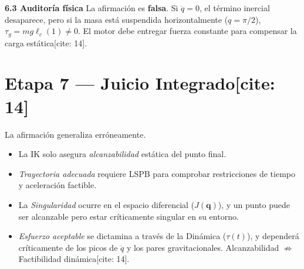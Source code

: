 \documentclass[11pt, a4paper]{article}
\begin{document}
\textbf{6.3 Auditoría física}
La afirmación es \textbf{falsa}. Si $\ddot{q}=0$, el término inercial desaparece, pero si la masa está suspendida horizontalmente ($q=\pi/2$), $\tau_g = mg\ell_c(1) \neq 0$. El motor debe entregar fuerza constante para compensar la carga estática[cite: 14].

\section*{Etapa 7 — Juicio Integrado[cite: 14]}
La afirmación generaliza erróneamente. 
\begin{itemize}
    \item La IK solo asegura \textit{alcanzabilidad} estática del punto final.
    \item \textit{Trayectoria adecuada} requiere LSPB para comprobar restricciones de tiempo y aceleración factible.
    \item La \textit{Singularidad} ocurre en el espacio diferencial ($J(\mathbf{q})$), y un punto puede ser alcanzable pero estar críticamente singular en su entorno.
    \item \textit{Esfuerzo aceptable} se dictamina a través de la Dinámica ($\tau(t)$), y dependerá críticamente de los picos de $\ddot{q}$ y los pares gravitacionales. Alcanzabilidad $\not\Rightarrow$ Factibilidad dinámica[cite: 14].
\end{itemize}
\end{document}
